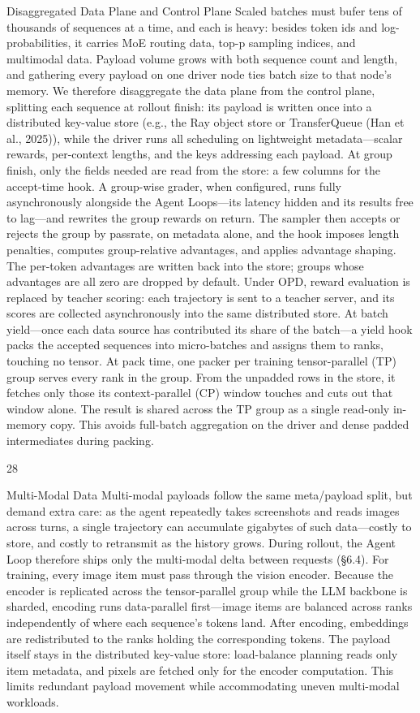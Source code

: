 \documentclass[
  10
]{article}
\begin{document}
Disaggregated Data Plane and Control Plane Scaled batches must bufer
tens of thousands of sequences at a time, and each is heavy: besides
token ids and log-probabilities, it carries MoE routing data, top-p
sampling indices, and multimodal data. Payload volume grows with both
sequence count and length, and gathering every payload on one driver
node ties batch size to that node's memory. We therefore disaggregate
the data plane from the control plane, splitting each sequence at
rollout finish: its payload is written once into a distributed key-value
store (e.g., the Ray object store or TransferQueue (Han et al., 2025)),
while the driver runs all scheduling on lightweight metadata---scalar
rewards, per-context lengths, and the keys addressing each payload. At
group finish, only the fields needed are read from the store: a few
columns for the accept-time hook. A group-wise grader, when configured,
runs fully asynchronously alongside the Agent Loops---its latency hidden
and its results free to lag---and rewrites the group rewards on return.
The sampler then accepts or rejects the group by passrate, on metadata
alone, and the hook imposes length penalties, computes group-relative
advantages, and applies advantage shaping. The per-token advantages are
written back into the store; groups whose advantages are all zero are
dropped by default. Under OPD, reward evaluation is replaced by teacher
scoring: each trajectory is sent to a teacher server, and its scores are
collected asynchronously into the same distributed store. At batch
yield---once each data source has contributed its share of the batch---a
yield hook packs the accepted sequences into micro-batches and assigns
them to ranks, touching no tensor. At pack time, one packer per training
tensor-parallel (TP) group serves every rank in the group. From the
unpadded rows in the store, it fetches only those its context-parallel
(CP) window touches and cuts out that window alone. The result is shared
across the TP group as a single read-only in-memory copy. This avoids
full-batch aggregation on the driver and dense padded intermediates
during packing.

28

Multi-Modal Data Multi-modal payloads follow the same meta/payload
split, but demand extra care: as the agent repeatedly takes screenshots
and reads images across turns, a single trajectory can accumulate
gigabytes of such data---costly to store, and costly to retransmit as
the history grows. During rollout, the Agent Loop therefore ships only
the multi-modal delta between requests (§6.4). For training, every image
item must pass through the vision encoder. Because the encoder is
replicated across the tensor-parallel group while the LLM backbone is
sharded, encoding runs data-parallel first---image items are balanced
across ranks independently of where each sequence's tokens land. After
encoding, embeddings are redistributed to the ranks holding the
corresponding tokens. The payload itself stays in the distributed
key-value store: load-balance planning reads only item metadata, and
pixels are fetched only for the encoder computation. This limits
redundant payload movement while accommodating uneven multi-modal
workloads.
\end{document}
